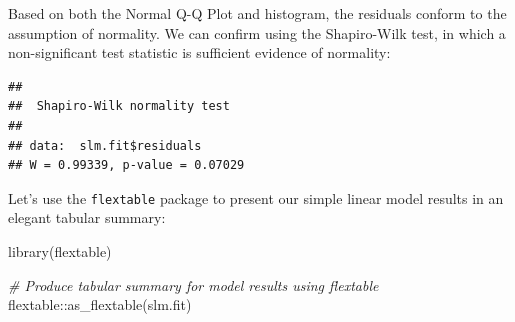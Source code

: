 \documentclass[
]{book}
\newenvironment{Shaded}{\begin{snugshade}}{\end{snugshade}}
\newcommand{\CommentTok}[1]{\textcolor[rgb]{0.56,0.35,0.01}{\textit{#1}}}
\newcommand{\FunctionTok}[1]{\textcolor[rgb]{0.00,0.00,0.00}{#1}}
\newcommand{\NormalTok}[1]{#1}
\newcommand{\SpecialCharTok}[1]{\textcolor[rgb]{0.00,0.00,0.00}{#1}}
\begin{document}
Based on both the Normal Q-Q Plot and histogram, the residuals conform to the assumption of normality. We can confirm using the Shapiro-Wilk test, in which a non-significant test statistic is sufficient evidence of normality:

\begin{Shaded}
\end{Shaded}

\begin{verbatim}
## 
##  Shapiro-Wilk normality test
## 
## data:  slm.fit$residuals
## W = 0.99339, p-value = 0.07029
\end{verbatim}

Let's use the \texttt{flextable} package to present our simple linear model results in an elegant tabular summary:

\begin{Shaded}
\begin{Highlighting}[]
\FunctionTok{library}\NormalTok{(flextable)}

\CommentTok{\# Produce tabular summary for model results using flextable}
\NormalTok{flextable}\SpecialCharTok{::}\FunctionTok{as\_flextable}\NormalTok{(slm.fit)}
\end{Highlighting}
\end{Shaded}

\providecommand{\docline}[3]{\noalign{\global\setlength{\arrayrulewidth}{#1}}\arrayrulecolor[HTML]{#2}\cline{#3}}

\setlength{\tabcolsep}{2pt}

\renewcommand*{\arraystretch}{1.5}
\end{document}

